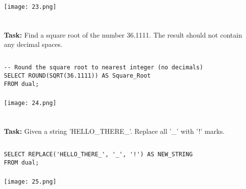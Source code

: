 \documentclass[12pt,a4paper]{article}
\begin{document}
\subsubsection{}
\begin{center}
    \texttt{[image: 23.png]}
\end{center}


\section{}
\textbf{Task:} Find a square root of the number 36.1111. The result should not contain
any decimal spaces.

\subsection{}
\begin{lstlisting}
-- Round the square root to nearest integer (no decimals)
SELECT ROUND(SQRT(36.1111)) AS Square_Root
FROM dual;
\end{lstlisting}

\subsubsection{}
\begin{center}
    \texttt{[image: 24.png]}
\end{center}


\section{}
\textbf{Task:} Given a string 'HELLO_THERE_'. Replace all '_' with '!' marks.

\subsection{}
\begin{lstlisting}
SELECT REPLACE('HELLO_THERE_', '_', '!') AS NEW_STRING
FROM dual;
\end{lstlisting}

\subsubsection{}
\begin{center}
    \texttt{[image: 25.png]}
\end{center}
\end{document}
